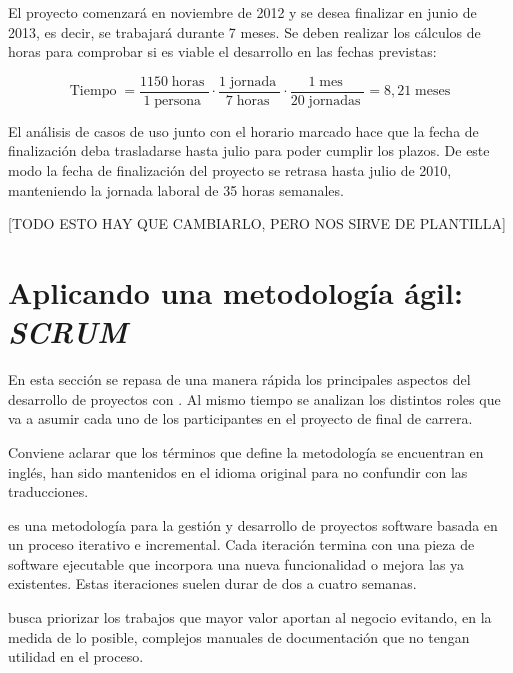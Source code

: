 El proyecto comenzará en noviembre de 2012 y se desea finalizar en junio de 2013, es decir, se trabajará durante 7 meses. Se deben realizar los cálculos de horas para comprobar si es viable el desarrollo en las fechas previstas:
\newcommand{\tiempo}{\operatorname{Tiempo}}
\newcommand{\horas}{\operatorname{horas}}
\newcommand{\persona}{\operatorname{persona}}
\newcommand{\jornada}{\operatorname{jornada}}
\newcommand{\jornadas}{\operatorname{jornadas}}
\newcommand{\mes}{\operatorname{mes}}
\newcommand{\meses}{\operatorname{meses}}
\newcommand{\semana}{\operatorname{semana}}
\newcommand{\hora}{\operatorname{hora}}

\[
 \tiempo = \dfrac{1150 \horas}{1 \persona} \cdot \dfrac{1 \jornada}{7 \horas} \cdot \dfrac{1 \mes}{20 \jornadas} = 8,21 \meses
\]

El análisis de casos de uso junto con el horario marcado hace que la fecha de finalización deba trasladarse hasta julio para poder cumplir los plazos. De este modo la fecha de finalización del proyecto se retrasa hasta julio de 2010, manteniendo la jornada laboral de 35 horas semanales.

[TODO ESTO HAY QUE CAMBIARLO, PERO NOS SIRVE DE PLANTILLA]
\newpage


\section{Aplicando una metodología ágil: \textit{SCRUM}}
En esta sección se repasa de una manera rápida los principales aspectos del desarrollo de proyectos con \scrum{}. Al mismo tiempo se analizan los distintos roles que va a asumir cada uno de los participantes en el proyecto de final de carrera.

Conviene aclarar que los términos que define la metodología \scrum {} se encuentran en inglés, han sido mantenidos en el idioma original para no confundir con las traducciones.

\scrum{}  es una metodología para la gestión y desarrollo de proyectos software basada en un proceso iterativo e incremental. Cada iteración termina con una pieza de software ejecutable que incorpora una nueva funcionalidad o mejora las ya existentes. Estas iteraciones suelen durar de dos a cuatro semanas.

\scrum{} busca priorizar los trabajos que mayor valor aportan al negocio evitando, en la medida de lo posible, complejos manuales de documentación que no tengan utilidad en el proceso.

